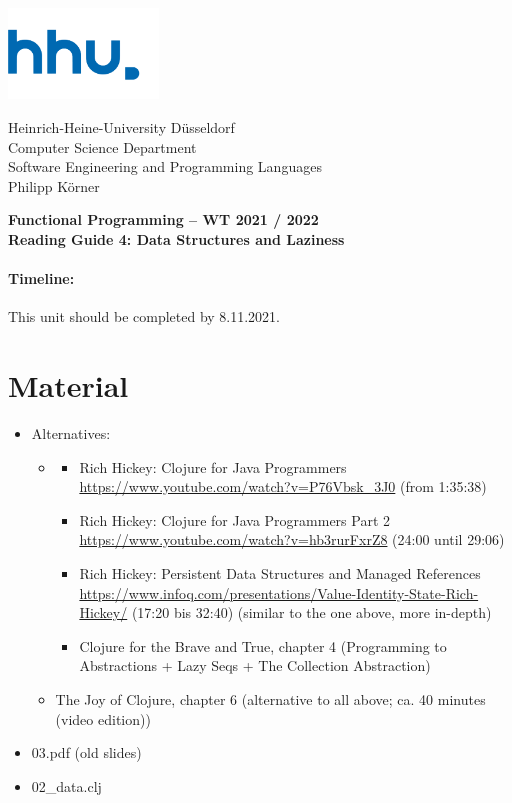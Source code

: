 \documentclass[11pt,a4paper]{article}
\begin{document}
	
	\begin{minipage}[b]{\textwidth}
		\parbox[t]{5cm}{%
			\includegraphics[width=4cm]{unilogo}
			\hfill
		}
		\parbox[b]{11cm}{%
			Heinrich-Heine-University D\"usseldorf\\
			Computer Science Department\\
			Software Engineering and Programming Languages\\
			Philipp K\"orner
		}
	\end{minipage}
\begin{center}
	\bf
	Functional Programming -- WT 2021 / 2022\\
	Reading Guide 4: Data Structures and Laziness
\end{center}

\pagestyle{empty}

\paragraph{Timeline:} This unit should be completed by 8.11.2021.

\section{Material} 

\begin{itemize}
    \item Alternatives:
        \begin{itemize}
            \item 
                \begin{itemize}
\item Rich Hickey: Clojure for Java Programmers \url{https://www.youtube.com/watch?v=P76Vbsk_3J0} (from 1:35:38)
\item Rich Hickey: Clojure for Java Programmers Part 2 \url{https://www.youtube.com/watch?v=hb3rurFxrZ8} (24:00 until 29:06)
\item Rich Hickey: Persistent Data Structures and Managed References \url{https://www.infoq.com/presentations/Value-Identity-State-Rich-Hickey/} (17:20 bis 32:40) (similar to the one above, more in-depth)
\item Clojure for the Brave and True, chapter 4 (Programming to Abstractions + Lazy Seqs + The Collection Abstraction)
                \end{itemize}
\item The Joy of Clojure, chapter 6 (alternative to all above; ca. 40 minutes (video edition))
        \end{itemize}
\item 03.pdf (old slides)
\item 02\_data.clj
\end{itemize}
\end{document}
